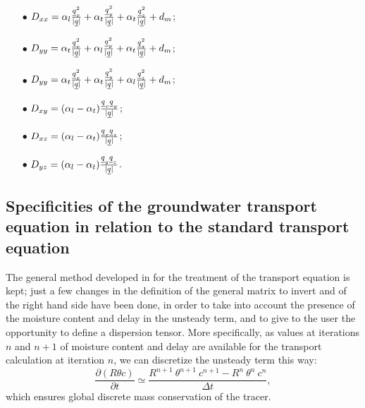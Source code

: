 \begin{itemize}
 \item[$\bullet$] $D_{xx}=\alpha_l\frac{\underline{q}_x^2}{\mid \underline{q} \mid}+\alpha_t\frac{\underline{q}_y^2}{\mid \underline{q} \mid}+\alpha_t \frac{\underline{q}_z^2}{\mid \underline{q} \mid}+d_m$;
 \item[$\bullet$] $D_{yy}=\alpha_t\frac{\underline{q}_x^2}{\mid \underline{q} \mid}+\alpha_l\frac{\underline{q}_y^2}{\mid \underline{q} \mid}+\alpha_t \frac{\underline{q}_z^2}{\mid \underline{q} \mid}+d_m$;
 \item[$\bullet$] $D_{yy}=\alpha_t\frac{\underline{q}_x^2}{\mid \underline{q} \mid}+\alpha_t\frac{\underline{q}_y^2}{\mid \underline{q} \mid}+\alpha_l \frac{\underline{q}_z^2}{\mid \underline{q} \mid}+d_m$;
 \item[$\bullet$] $D_{xy}=(\alpha_l - \alpha_t) \frac{\underline{q}_x \underline{q}_y}{\mid \underline{q} \mid}$;
 \item[$\bullet$] $D_{xz}=(\alpha_l - \alpha_t) \frac{\underline{q}_x \underline{q}_z}{\mid \underline{q} \mid}$;
 \item[$\bullet$] $D_{yz}=(\alpha_l - \alpha_t) \frac{\underline{q}_y \underline{q}_z}{\mid \underline{q} \mid}$.
\end{itemize}

\subsection{Specificities of the groundwater transport equation in relation to the standard transport equation}
The general method developed in \CS for the treatment of the transport equation is kept; just a few changes in the definition
of the general matrix to invert and of the right hand side have been done, in order to take into account the presence of the
moisture content and delay in the unsteady term,
and to give to the user the opportunity to define a dispersion tensor.
More specifically, as values at iterations $n$ and $n+1$ of moisture content and delay are available for the transport calculation at iteration $n$,
we can discretize the unsteady term this way:
\begin{equation}
\label{unsteady}
\frac{\partial(R \theta c)}{\partial{t}} \simeq \frac{R^{n+1} \ \theta^{n+1} \ c^{n+1} - R^{n} \ \theta^{n} \ c^{n}}{\Delta t},
\end{equation}
which ensures global discrete mass conservation of the tracer.

